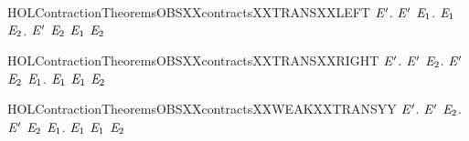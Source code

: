 \newcommand{\HOLContractionTheoremsOBSXXcontractsXXTRANS}{\UseVerbatim{HOLContractionTheoremsOBSXXcontractsXXTRANS}}
\begin{SaveVerbatim}{HOLContractionTheoremsOBSXXcontractsXXTRANSXXLEFT}
\HOLTokenTurnstile{} \HOLSymConst{\HOLTokenForall{}} \ensuremath{\HOLBoundVar{E}\sp{\prime}}.
         \ensuremath{\HOLBoundVar{E}\sp{\prime}} \HOLSymConst{\HOLTokenImp{}}
       \HOLSymConst{\HOLTokenForall{}} \ensuremath{\HOLBoundVar{E}\sb{\mathrm{1}}}.  \HOLTokenTransBegin{}\HOLTokenTransEnd \ensuremath{\HOLBoundVar{E}\sb{\mathrm{1}}} \HOLSymConst{\HOLTokenImp{}} \HOLSymConst{\HOLTokenExists{}}\ensuremath{\HOLBoundVar{E}\sb{\mathrm{2}}}. \ensuremath{\HOLBoundVar{E}\sp{\prime}} \HOLTokenTransBegin{}\HOLTokenTransEnd \ensuremath{\HOLBoundVar{E}\sb{\mathrm{2}}} \HOLSymConst{\HOLTokenConj{}} \ensuremath{\HOLBoundVar{E}\sb{\mathrm{1}}}  \ensuremath{\HOLBoundVar{E}\sb{\mathrm{2}}}
\end{SaveVerbatim}
\newcommand{\HOLContractionTheoremsOBSXXcontractsXXTRANSXXLEFT}{\UseVerbatim{HOLContractionTheoremsOBSXXcontractsXXTRANSXXLEFT}}
\begin{SaveVerbatim}{HOLContractionTheoremsOBSXXcontractsXXTRANSXXRIGHT}
\HOLTokenTurnstile{} \HOLSymConst{\HOLTokenForall{}} \ensuremath{\HOLBoundVar{E}\sp{\prime}}.
         \ensuremath{\HOLBoundVar{E}\sp{\prime}} \HOLSymConst{\HOLTokenImp{}}
       \HOLSymConst{\HOLTokenForall{}} \ensuremath{\HOLBoundVar{E}\sb{\mathrm{2}}}. \ensuremath{\HOLBoundVar{E}\sp{\prime}} \HOLTokenTransBegin{}\HOLTokenTransEnd \ensuremath{\HOLBoundVar{E}\sb{\mathrm{2}}} \HOLSymConst{\HOLTokenImp{}} \HOLSymConst{\HOLTokenExists{}}\ensuremath{\HOLBoundVar{E}\sb{\mathrm{1}}}.  \HOLTokenWeakTransBegin{}\HOLTokenWeakTransEnd \ensuremath{\HOLBoundVar{E}\sb{\mathrm{1}}} \HOLSymConst{\HOLTokenConj{}}  \ensuremath{\HOLBoundVar{E}\sb{\mathrm{1}}} \ensuremath{\HOLBoundVar{E}\sb{\mathrm{2}}}
\end{SaveVerbatim}
\newcommand{\HOLContractionTheoremsOBSXXcontractsXXTRANSXXRIGHT}{\UseVerbatim{HOLContractionTheoremsOBSXXcontractsXXTRANSXXRIGHT}}
\begin{SaveVerbatim}{HOLContractionTheoremsOBSXXcontractsXXWEAKXXTRANSYY}
\HOLTokenTurnstile{} \HOLSymConst{\HOLTokenForall{}} \ensuremath{\HOLBoundVar{E}\sp{\prime}}.
         \ensuremath{\HOLBoundVar{E}\sp{\prime}} \HOLSymConst{\HOLTokenImp{}}
       \HOLSymConst{\HOLTokenForall{}} \ensuremath{\HOLBoundVar{E}\sb{\mathrm{2}}}. \ensuremath{\HOLBoundVar{E}\sp{\prime}} \HOLTokenWeakTransBegin{}\HOLTokenWeakTransEnd \ensuremath{\HOLBoundVar{E}\sb{\mathrm{2}}} \HOLSymConst{\HOLTokenImp{}} \HOLSymConst{\HOLTokenExists{}}\ensuremath{\HOLBoundVar{E}\sb{\mathrm{1}}}.  \HOLTokenWeakTransBegin{}\HOLTokenWeakTransEnd \ensuremath{\HOLBoundVar{E}\sb{\mathrm{1}}} \HOLSymConst{\HOLTokenConj{}}  \ensuremath{\HOLBoundVar{E}\sb{\mathrm{1}}} \ensuremath{\HOLBoundVar{E}\sb{\mathrm{2}}}
\end{SaveVerbatim}
